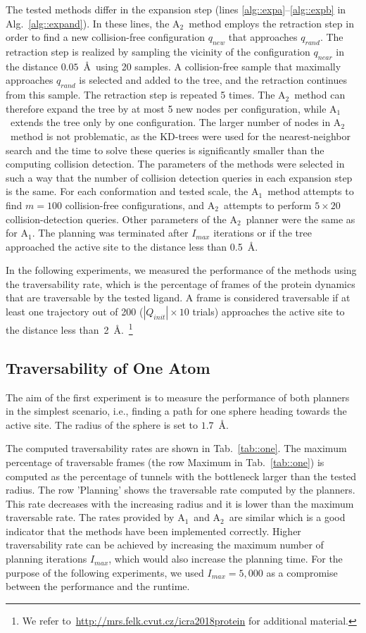 \documentclass[usletter, 10pt, conference]{ieeeconf} %
\def\qrand{q_{rand}}
\def\qnear{q_{near}}
\def\qnew{q_{new}}
\def\QI{Q_{init}}
\def\Imax{I_{max}} %
\def\RA{A$_{1}$}
\def\RB{A$_{2}$}
\begin{document}
The tested methods differ in the expansion step (lines \ref{alg::expa}--\ref{alg::expb} in Alg.~\ref{alg::expand}).
In these lines, the \RB\ method employs the retraction step in order to find a new collision-free configuration $\qnew$ that approaches $\qrand$.
The retraction step is realized by sampling the vicinity of the configuration $\qnear$ in the distance $0.05$~\AA\ using 20 samples.
A collision-free sample that maximally approaches $\qrand$ is selected and added to the tree, and the retraction continues from this sample.
The retraction step is repeated 5 times.
The \RB\ method can therefore expand the tree by at most 5 new nodes per configuration, while \RA\ extends the tree only by one configuration.
The larger number of nodes in \RB\ method is not problematic, as the KD-trees were used for the nearest-neighbor search and the time to solve these queries is significantly smaller than the computing collision detection.
The parameters of the methods were selected in such a way that the number of collision detection queries in each expansion step is the same.
For each conformation and tested scale, the \RA\ method attempts to find $m=100$ collision-free configurations, and \RB\ attempts to perform $5 \times 20$ collision-detection queries.
Other parameters of the \RB\ planner were the same as for \RA.
The planning was terminated after $\Imax$ iterations or if the tree approached the active site to the distance less than 0.5~\AA.

In the following experiments, we measured the performance of the methods using the traversability rate, which is the percentage of frames of the protein dynamics that are traversable by the tested ligand.
A frame is considered traversable if at least one trajectory out of 200 ($\!|\QI|\!\times\!\!10$ trials) approaches the active site to the distance less than~2~\AA.~\footnote{We refer to~\url{http://mrs.felk.cvut.cz/icra2018protein} for additional material.}

\subsection{Traversability of One Atom}

The aim of the first experiment is to measure the performance of both planners in the simplest scenario, i.e., finding a path for one sphere heading towards the active site.
The radius of the sphere is set to $1.7$~\AA. 

The computed traversability rates are shown in Tab.~\ref{tab::one}.
The maximum percentage of traversable frames (the row Maximum in Tab.~\ref{tab::one}) is computed as the percentage of tunnels with the bottleneck larger than the tested radius.
The row 'Planning' shows the traversable rate computed by the planners.
This rate decreases with the increasing radius and it is lower than the maximum traversable rate.
The rates provided by \RA\ and \RB\ are similar which is a good indicator that the methods have been implemented correctly.
Higher traversability rate can be achieved by increasing the maximum number of planning iterations $\Imax$, which would also
increase the planning time.
For the purpose of the following experiments, we used $\Imax=5,000$ as a compromise between the performance and the runtime.
\end{document}
